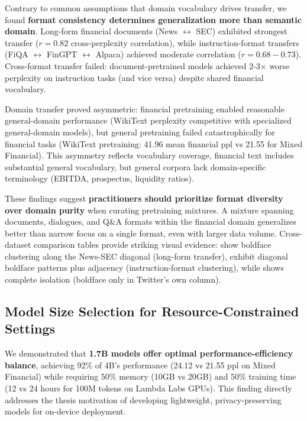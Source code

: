 Contrary to common assumptions that domain vocabulary drives transfer, we found \textbf{format consistency determines generalization more than semantic domain}. Long-form financial documents (News $\leftrightarrow$ SEC) exhibited strongest transfer ($r = 0.82$ cross-perplexity correlation), while instruction-format transfers (FiQA $\leftrightarrow$ FinGPT $\leftrightarrow$ Alpaca) achieved moderate correlation ($r = 0.68-0.73$). Cross-format transfer failed: document-pretrained models achieved 2-3$\times$ worse perplexity on instruction tasks (and vice versa) despite shared financial vocabulary.

Domain transfer proved asymmetric: financial pretraining enabled reasonable general-domain performance (WikiText perplexity competitive with specialized general-domain models), but general pretraining failed catastrophically for financial tasks (WikiText pretraining: 41.96 mean financial ppl vs 21.55 for Mixed Financial). This asymmetry reflects vocabulary coverage, financial text includes substantial general vocabulary, but general corpora lack domain-specific terminology (EBITDA, prospectus, liquidity ratios).

These findings suggest \textbf{practitioners should prioritize format diversity over domain purity} when curating pretraining mixtures. A mixture spanning documents, dialogues, and Q\&A formats within the financial domain generalizes better than narrow focus on a single format, even with larger data volume. Cross-dataset comparison tables provide striking visual evidence:  show boldface clustering along the News-SEC diagonal (long-form transfer),  exhibit diagonal boldface patterns plus adjacency (instruction-format clustering), while  shows complete isolation (boldface only in Twitter's own column).

\subsection{Model Size Selection for Resource-Constrained Settings}

We demonstrated that \textbf{1.7B models offer optimal performance-efficiency balance}, achieving 92\% of 4B's performance (24.12 vs 21.55 ppl on Mixed Financial) while requiring 50\% memory (10GB vs 20GB) and 50\% training time (12 vs 24 hours for 100M tokens on Lambda Labs GPUs). This finding directly addresses the thesis motivation of developing lightweight, privacy-preserving models for on-device deployment.

